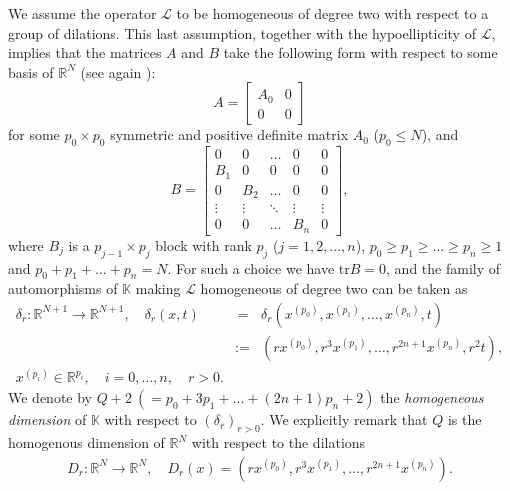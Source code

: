 \documentclass[10pt]{amsart}
\def\elle{\mathcal{L}}
\def\erre{\mathbb{R}}
\newcommand{\ttende}{\longrightarrow}
\numberwithin{equation}{section}
\begin{document}
We assume the operator $\elle$ to be homogeneous of degree two with respect to a group of dilations. This last assumption, together with the hypoellipticity of $\elle$, implies that the matrices $A$ and $B$ take the following form with respect to some basis of $\mathbb{R}^{N}$ 
(see again \cite[Section 1]{LP}):
\begin{equation}\label{A}
A=
\begin{bmatrix}
A_{0} & 0\\
0 & 0
\end{bmatrix}
\end{equation}
for some $p_{0}\times p_{0}$ symmetric and positive definite matrix $A_{0}$ ($p_{0}\leq N$), and
\begin{equation}\label{B}
B=
\begin{bmatrix}
0 & 0 & \ldots & 0 & 0 \\
B_{1}  & 0  & 0  & 0  & 0  \\
0 & B_{2}& \ldots & 0 & 0 \\
\vdots & \vdots & \ddots & \vdots & \vdots\\
0 & 0 & \ldots &  B_{n} & 0 
\end{bmatrix},
\end{equation}
where $B_{j}$ is a $p_{j-1}\times p_{j}$ block with rank $p_{j}$ ($j=1,2,...,n$), $p_{0}\geq p_{1}\geq...\geq p_{n}\geq1$ and $p_{0}+p_{1}+...+p_{n}=N$. For such a choice we have $\mathrm{tr} B =0$, and the family of automorphisms of $\mathbb{K}$ making $\elle$ homogeneous of degree two can be taken as
\begin{eqnarray*}\delta_r:\erre^{N+1}\ttende\erre^{N+1},\quad \delta_r(x,t)&\,=&
\delta_r(x^{(p_0)},x^{(p_1)},\ldots,x^{(p_n)},t)\\&:=&\left(r
x^{(p_0)},r^3
x^{(p_1)},\ldots,r^{2n+1}x^{(p_n)},r^2t\right),\\ x^{(p_i)}\in\erre^{p_i},\quad i=0,\ldots,n ,\quad r>0.\end{eqnarray*}
We denote by $Q+2 \ (=p_{0}+ 3 p_{1}+...+ (2n +1 ) p_{n} + 2 )$ the {\it homogeneous dimension} of $\mathbb{K}$ with respect to $(\delta_r)_{r>0}$. We explicitly remark 
that $Q$ is the homogenous dimension of $\erre^N$ with respect to the dilations 
 \begin{eqnarray*}D_r:\erre^{N}\ttende\erre^{N},\quad D_r(x) = \left(r
x^{(p_0)},r^3
x^{(p_1)},\ldots,r^{2n+1}x^{(p_n)}\right).\end{eqnarray*}
\end{document}
